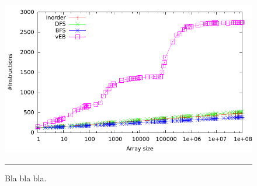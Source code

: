 \begin{figure}[htbp]
	\centering
		\includegraphics[width=\textwidth]{./Figures/Project1/Instructions.pdf}
		\rule{35em}{0.5pt}
	\caption[Instructions]{
	Bla bla bla.
	}
	\label{fig:Instructions_p1}
\end{figure}

